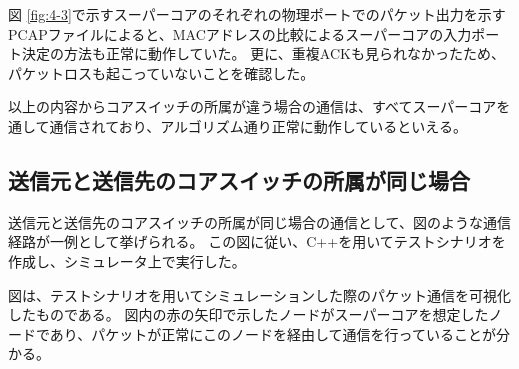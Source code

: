 図 \ref{fig:4-3}で示すスーパーコアのそれぞれの物理ポートでのパケット出力を示すPCAPファイルによると、MACアドレスの比較によるスーパーコアの入力ポート決定の方法も正常に動作していた。
更に、重複ACKも見られなかったため、パケットロスも起こっていないことを確認した。

以上の内容からコアスイッチの所属が違う場合の通信は、すべてスーパーコアを通して通信されており、アルゴリズム通り正常に動作しているといえる。

\subsection{送信元と送信先のコアスイッチの所属が同じ場合}

送信元と送信先のコアスイッチの所属が同じ場合の通信として、図のような通信経路が一例として挙げられる。
この図に従い、C++を用いてテストシナリオを作成し、シミュレータ上で実行した。



図は、テストシナリオを用いてシミュレーションした際のパケット通信を可視化したものである。
図内の赤の矢印で示したノードがスーパーコアを想定したノードであり、パケットが正常にこのノードを経由して通信を行っていることが分かる。

